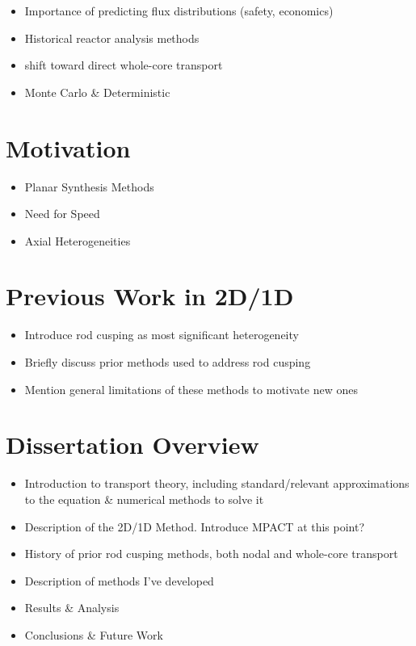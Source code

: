\begin{itemize}
    \item Importance of predicting flux distributions (safety, economics)
    \item Historical reactor analysis methods
    \item shift toward direct whole-core transport
    \item Monte Carlo \& Deterministic
\end{itemize}

\section{Motivation}

\begin{itemize}
    \item Planar Synthesis Methods
    \item Need for Speed
    \item Axial Heterogeneities
\end{itemize}

\section{Previous Work in 2D/1D}

\begin{itemize}
    \item Introduce rod cusping as most significant heterogeneity
    \item Briefly discuss prior methods used to address rod cusping
    \item Mention general limitations of these methods to motivate new ones
\end{itemize}

\section{Dissertation Overview}

\begin{itemize}
    \item Introduction to transport theory, including standard/relevant approximations to the equation \& numerical methods to solve it
    \item Description of the 2D/1D Method.  Introduce MPACT at this point?
    \item History of prior rod cusping methods, both nodal and whole-core transport
    \item Description of methods I've developed
    \item Results \& Analysis
    \item Conclusions \& Future Work
\end{itemize}